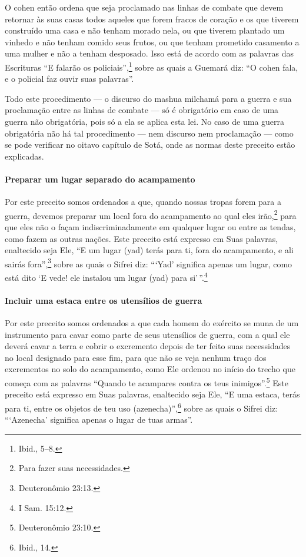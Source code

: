 \begin{multicols}{2}
O cohen\starr{} então ordena que seja proclamado nas linhas de combate que
devem retornar às suas casas todos aqueles que forem fracos de coração e
os que tiverem construído uma casa e não tenham morado nela, ou que
tiverem plantado um vinhedo e não tenham comido seus frutos, ou que
tenham prometido casamento a uma mulher e não a tenham desposado. Isso
está de acordo com as palavras das Escrituras ``E falarão os policiais'',\footnote{Ibid., 5--8.} sobre as quais a Guemará\starr{} diz: ``O cohen\starr{} fala, e o
policial faz ouvir suas palavras''.

Todo este procedimento --- o discurso do mashua milchamá\starr{} para a
guerra e sua proclamação entre as linhas de combate --- só é obrigatório
em caso de uma guerra não obrigatória, pois só a ela se aplica esta lei.
No caso de uma guerra obrigatória não há tal procedimento --- nem
discurso nem proclamação --- como se pode verificar no oitavo capítulo
de Sotá\starr, onde as normas deste preceito estão explicadas.

\paragraph{Preparar um lugar separado do acampamento}

Por este preceito somos ordenados a que, quando nossas tropas forem para a guerra, devemos preparar um local fora do acampamento ao qual
eles irão,\footnote{Para fazer suas necessidades.} para que eles não o façam
indiscriminadamente em qualquer lugar ou entre as tendas, como fazem as outras nações. Este preceito está expresso em Suas palavras, enaltecido seja Ele, ``E um lugar (yad) terás para ti, fora
do acampamento, e ali sairás fora'',\footnote{Deuteronômio 23:13.} sobre as quais
o Sifrei\starr{} diz: ```Yad' significa apenas um lugar, como está dito `E vede!
ele instalou um lugar (yad) para si'\,''.\footnote{I Sam. 15:12.}

\paragraph{Incluir uma estaca entre os utensílios de guerra}

Por este preceito somos ordenados a que cada homem do exército se muna
de um instrumento para cavar como parte de seus utensílios de guerra,
com a qual ele deverá cavar a terra e cobrir o excremento depois de ter
feito suas necessidades no local designado para esse fim, para que não
se veja nenhum traço dos excrementos no solo do acampamento, como Ele
ordenou no início do trecho que começa com as palavras ``Quando te
acampares contra os teus inimigos''.\footnote{Deuteronômio 23:10.} Este preceito está expresso em
Suas palavras, enaltecido seja Ele, ``E uma estaca, terás para ti, entre
os objetos de teu uso (azenecha)'',\footnote{Ibid., 14.} sobre as quais o Sifrei\starr{}
diz: ```Azenecha' significa apenas o lugar de tuas armas''.


\end{multicols}
